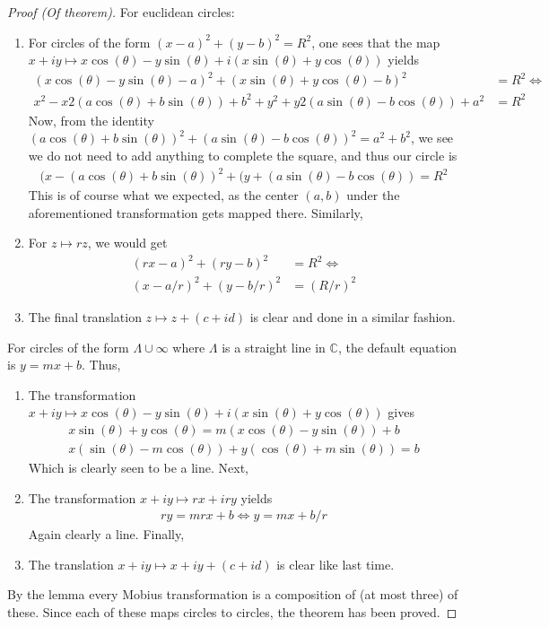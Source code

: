 \documentclass[12pt]{article}
\theoremstyle{definitionstyle}
\def\mbb#1{\mathbb{#1}}
\def \C{\mbb{C}}
\begin{document}
	\begin{proof}[Proof (Of theorem)]
		For euclidean circles:
		\begin{enumerate}[label=(\roman*)]
			\item For circles of the form $(x-a)^2 + (y-b)^2 = R^2$, one sees that the map $x+iy \mapsto x\cos(\theta)-y\sin(\theta)+i(x\sin(\theta)+y\cos(\theta))$ yields
			\begin{align*}
				(x\cos(\theta)-y\sin(\theta)-a)^2 + (x\sin(\theta)+y\cos(\theta)-b)^2 &= R^2 \iff \\
				x^2-x2(a\cos(\theta)+b\sin(\theta)) + b^2 + y^2 +y2(a\sin(\theta)-b\cos(\theta)) + a^2 &= R^2
			\end{align*}
			Now, from the identity $(a \cos(\theta)+b \sin(\theta))^2+(a\sin(\theta)-b\cos(\theta))^2 = a^2+b^2$, we see we do not need to add anything to complete the square, and thus our circle is
			\begin{align*}
				(x-(a\cos(\theta)+b\sin(\theta))^2 + (y+(a\sin(\theta)-b\cos(\theta)) = R^2
			\end{align*}
			This is of course what we expected, as the center $(a, b)$ under the aforementioned transformation gets mapped there. Similarly, \item For $z \mapsto rz$, we would get 
			\begin{align*}
				(rx-a)^2 + (ry-b)^2 &= R^2 \iff \\
				(x-a/r)^2 + (y-b/r)^2 &= (R/r)^2
			\end{align*}
			\item The final translation $z \mapsto z+(c+id)$ is clear and done in a similar fashion.
		\end{enumerate}
		For circles of the form $\Lambda \cup \infty$ where $\Lambda$ is a straight line in $\C$, the default equation is $y = mx + b$. Thus,
		\begin{enumerate}[label=(\roman*)]
			\item The transformation $x+iy \mapsto x\cos(\theta)-y\sin(\theta)+i(x\sin(\theta)+y\cos(\theta))$ gives
			\begin{align*}
				x\sin(\theta)+y\cos(\theta) = m(x\cos(\theta)-y\sin(\theta)) + b \\
				x(\sin(\theta)-m\cos(\theta)) + y(\cos(\theta)+m\sin(\theta)) = b
			\end{align*}
			Which is clearly seen to be a line. Next,
			\item The transformation $x+iy \mapsto rx + iry$ yields
			\begin{align*}
				ry = mrx + b \iff y = mx + b/r
			\end{align*}
			Again clearly a line. Finally,
			\item The translation $x + iy \mapsto x + iy + (c+id)$ is clear like last time. 
		\end{enumerate}
	
		By the lemma every Mobius transformation is a composition of (at most three) of these. Since each of these maps circles to circles, the theorem has been proved.
	\end{proof}
\end{document}

